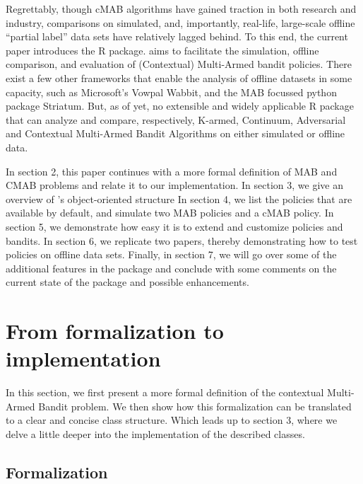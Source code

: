 \documentclass[nojss]{jss}\usepackage[]{graphicx}\usepackage[]{color}
\begin{document}
Regrettably, though cMAB algorithms have gained traction in both research and industry, comparisons on simulated, and, importantly, real-life, large-scale offline \textquotedblleft{}partial label\textquotedblright{} data sets have relatively lagged behind. To this end, the current paper introduces the  R package.  aims to facilitate the simulation, offline comparison, and evaluation of (Contextual) Multi-Armed bandit policies. There exist a few other frameworks that enable the analysis of offline datasets in some capacity, such as Microsoft's Vowpal Wabbit, and the MAB focussed python package Striatum. But, as of yet, no extensible and widely applicable R package that can analyze and compare, respectively, K-armed, Continuum, Adversarial and Contextual Multi-Armed Bandit Algorithms on either simulated or offline data.

In section 2, this paper continues with a more formal definition of MAB and CMAB problems and relate it to our implementation. In section 3, we give an overview of ’s object-oriented structure In section 4, we list the policies that are available by default, and simulate two MAB policies and a cMAB policy. In section 5, we demonstrate how easy it is to extend and customize  policies and bandits. In section 6, we replicate two papers, thereby demonstrating how to test policies on offline data sets. Finally, in section  7, we will go over some of the additional features in the package and conclude with some comments on the current state of the package and possible enhancements.

\section{From formalization to implementation}

In this section, we first present a more formal definition of the contextual Multi-Armed Bandit problem. We then show how this formalization can be translated to a clear and concise class structure. Which leads up to section 3, where we delve a little deeper into the implementation of the described classes.

\subsection{Formalization}
\end{document}
